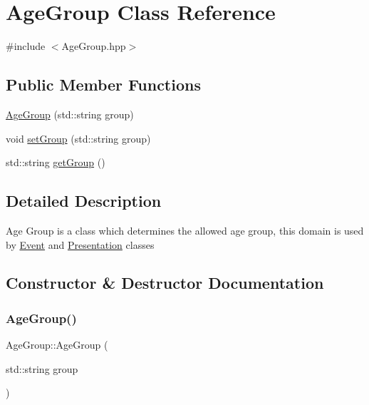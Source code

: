 \hypertarget{class_age_group}{}\section{Age\+Group Class Reference}
\label{class_age_group}


{\ttfamily \#include $<$Age\+Group.\+hpp$>$}

\subsection*{Public Member Functions}
\begin{DoxyCompactItemize}
\item 
\mbox{\hyperlink{class_age_group_ac380576ccc3bfabd4a96d131a0be525c}{Age\+Group}} (std\+::string group)
\item 
void \mbox{\hyperlink{class_age_group_a635bb5eabb52a4c7a7999935beb2909f}{set\+Group}} (std\+::string group)
\item 
std\+::string \mbox{\hyperlink{class_age_group_a5ed86fb98bb833c1df8ceb70c6418b4a}{get\+Group}} ()
\end{DoxyCompactItemize}


\subsection{Detailed Description}
Age Group is a class which determines the allowed age group, this domain is used by \mbox{\hyperlink{class_event}{Event}} and \mbox{\hyperlink{class_presentation}{Presentation}} classes 

\subsection{Constructor \& Destructor Documentation}
\mbox{\label{class_age_group_ac380576ccc3bfabd4a96d131a0be525c}} 
\subsubsection{\texorpdfstring{AgeGroup()}{AgeGroup()}}
{\footnotesize\ttfamily Age\+Group\+::\+Age\+Group (\begin{DoxyParamCaption}\item[{std\+::string}]{group }\end{DoxyParamCaption})}



